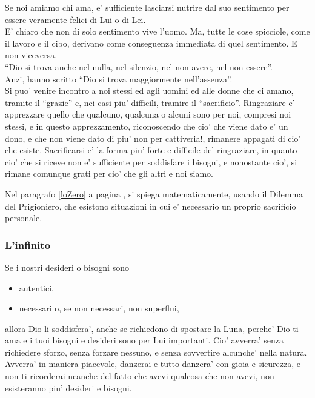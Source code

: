 Se noi amiamo chi ama, e' sufficiente lasciarsi nutrire dal suo sentimento per essere veramente felici di Lui o di Lei.\\
E' chiaro che non di solo sentimento vive l'uomo. Ma, tutte le cose spicciole, come il lavoro e il cibo, derivano come conseguenza immediata di quel sentimento. E non viceversa.\\

``Dio si trova anche nel nulla, nel silenzio, nel non avere, nel non essere''.\\
Anzi, hanno scritto ``Dio si trova maggiormente nell'assenza''.\\

Si puo' venire incontro a noi stessi ed agli uomini ed alle donne che ci amano, tramite il ``grazie'' e, nei casi piu' difficili, tramire il ``sacrificio''. Ringraziare e' apprezzare quello che qualcuno, qualcuna o alcuni sono per noi, compresi noi stessi, e in questo apprezzamento, riconoscendo che cio' che viene dato e' un dono, e che non viene dato di piu' non per cattiveria!, rimanere appagati di cio' che esiste. Sacrificarsi e' la forma piu' forte e difficile del ringraziare, in quanto cio' che si riceve non e' sufficiente per soddisfare i bisogni, e nonostante cio', si rimane comunque grati per cio' che gli altri e noi siamo. 

Nel paragrafo \ref{loZero} a pagina , si spiega matematicamente, usando il Dilemma del Prigioniero, che esistono situazioni in cui e' necessario un proprio sacrificio personale.

\subsubsection{L'infinito}

Se i nostri desideri o bisogni sono 
\begin{itemize}
    \item autentici,
    \item necessari o, se non necessari, non superflui,
\end{itemize}
allora Dio li soddisfera', anche se richiedono di spostare la Luna, perche' Dio ti ama e i tuoi bisogni e desideri sono per Lui importanti. Cio' avverra' senza richiedere sforzo, senza forzare nessuno, e senza sovvertire alcunche' nella natura. Avverra' in maniera piacevole, danzerai e tutto danzera' con gioia e sicurezza, e non ti ricorderai neanche del fatto che avevi qualcosa che non avevi, non esisteranno piu' desideri e bisogni.\\


